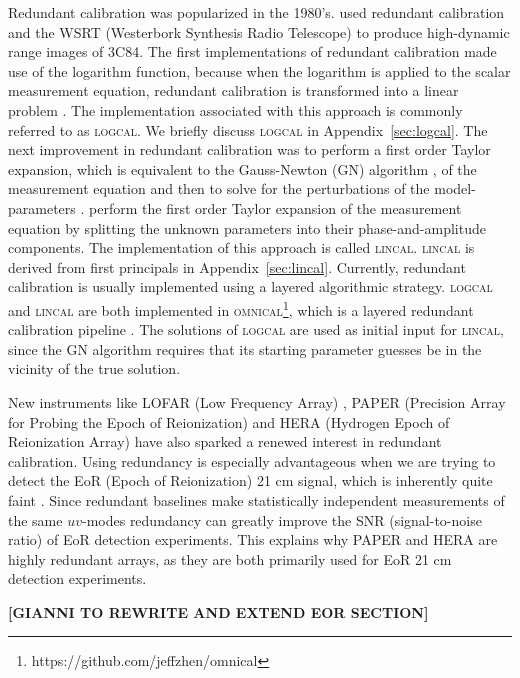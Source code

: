 \documentclass[useAMS,usenatbib]{mn2e}
\begin{document}
Redundant calibration was popularized in the 1980's. \citet{Noordam1982} used redundant calibration and the WSRT (Westerbork Synthesis Radio Telescope) to produce high-dynamic range images of 3C84.
The first implementations of redundant calibration made use of the logarithm function, because when the logarithm is applied to the scalar measurement equation, redundant 
calibration is transformed into a linear problem \citep{Wieringa1992,Camps2003,Liu2010}. The implementation associated with this approach is commonly referred to as \textsc{logcal}.
We briefly discuss \textsc{logcal} in Appendix~\ref{sec:logcal}. The next improvement in redundant calibration was to perform a first order Taylor expansion, which is equivalent to the Gauss-Newton (GN) algorithm \citep{Kurien2016}, of the measurement equation and then to solve for the
perturbations of the model-parameters \citep{Liu2010}. \citet{Liu2010} perform the first order Taylor expansion of the measurement equation by splitting the unknown parameters into their phase-and-amplitude
components. The implementation of  this approach is called \textsc{lincal}. \textsc{lincal} is derived from first principals in Appendix~\ref{sec:lincal}. 
Currently, redundant calibration is usually implemented using a layered algorithmic strategy. \textsc{logcal} and \textsc{lincal} are both implemented in \textsc{omnical}\footnote{https://github.com/jeffzhen/omnical}, which is a layered redundant calibration pipeline \citep{Zheng2014,Ali2015}.
The solutions of \textsc{logcal} are used as initial input for \textsc{lincal}, since the GN algorithm requires that its starting parameter guesses be in the vicinity 
of the true solution.

New instruments like LOFAR (Low Frequency Array) \citep{Noorishad2012}, PAPER (Precision Array for Probing the Epoch of Reionization) \citep{Ali2015} and HERA (Hydrogen Epoch of Reionization Array) \citep{deboer2015} have also sparked a renewed interest in redundant calibration. Using redundancy is especially advantageous when we are trying to detect the EoR (Epoch of Reionization) 21 cm signal,
which is inherently quite faint \citep{Parsons2012}. Since redundant baselines make statistically independent measurements of the same $uv$-modes redundancy can greatly 
improve the SNR (signal-to-noise ratio) of EoR detection experiments. This explains why PAPER and HERA are highly redundant arrays, as they are both primarily used for EoR 21 cm detection experiments.

\noindent
\textbf{[GIANNI TO REWRITE AND EXTEND EOR SECTION]}
\end{document}

